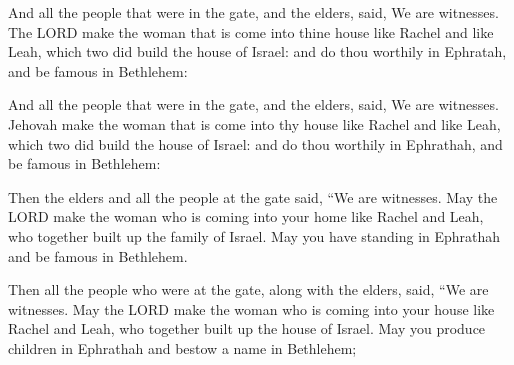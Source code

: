 			And all the people that were in the gate, and the elders, said, We are witnesses. The LORD make the woman that is come into thine house like Rachel and like Leah, which two did build the house of Israel: and do thou worthily in Ephratah, and be famous in Bethlehem:

			\begin{versebox}
					\item[BHS] 
					\item[LXX] 
					\item[ASV] And all the people that were in the gate, and the elders, said, We are witnesses. Jehovah make the woman that is come into thy house like Rachel and like Leah, which two did build the house of Israel: and do thou worthily in Ephrathah, and be famous in Bethlehem:
					\item[NIV] Then the elders and all the people at the gate said, “We are witnesses. May the LORD make the woman who is coming into your home like Rachel and Leah, who together built up the family of Israel. May you have standing in Ephrathah and be famous in Bethlehem.
					\item[NRSV] Then all the people who were at the gate, along with the elders, said, “We are witnesses. May the LORD make the woman who is coming into your house like Rachel and Leah, who together built up the house of Israel. May you produce children in Ephrathah and bestow a name in Bethlehem;
			\end{versebox}


